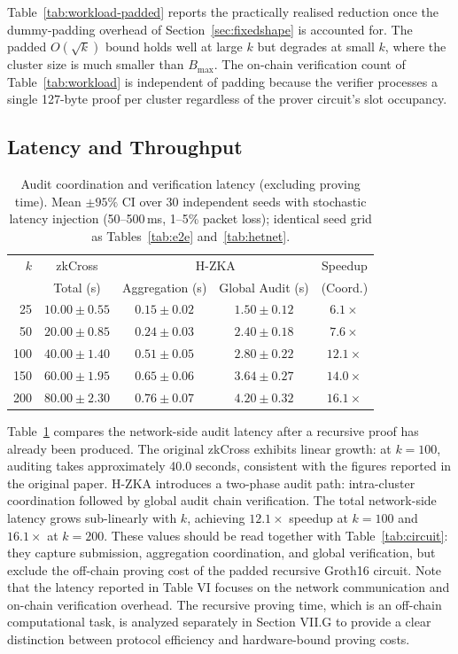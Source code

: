 \documentclass[journal]{IEEEtran}
\begin{document}
Table~\ref{tab:workload-padded} reports the practically realised reduction once the dummy-padding overhead of Section~\ref{sec:fixedshape} is accounted for. The padded $O(\sqrt{k})$ bound holds well at large $k$ but degrades at small $k$, where the cluster size is much smaller than $B_{\max}$. The on-chain verification count of Table~\ref{tab:workload} is independent of padding because the verifier processes a single 127-byte proof per cluster regardless of the prover circuit's slot occupancy.

\subsection{Latency and Throughput}

\begin{table}[t]
\centering
\caption{Audit coordination and verification latency (excluding proving time). Mean $\pm 95\%$ CI over $30$ independent seeds with stochastic latency injection (50--500\,ms, 1--5\% packet loss); identical seed grid as Tables~\ref{tab:e2e} and~\ref{tab:hetnet}.}
\label{tab:latency}
\begin{tabular}{rcccc}
\toprule
$k$ & zkCross & \multicolumn{2}{c}{H-ZKA} & Speedup \\
    & Total (s)   & Aggregation (s) & Global Audit (s) & (Coord.) \\
\midrule
25  & $10.00 \pm 0.55$ & $0.15 \pm 0.02$ & $1.50 \pm 0.12$ & $6.1\times$ \\
50  & $20.00 \pm 0.85$ & $0.24 \pm 0.03$ & $2.40 \pm 0.18$ & $7.6\times$ \\
100 & $40.00 \pm 1.40$ & $0.51 \pm 0.05$ & $2.80 \pm 0.22$ & $12.1\times$ \\
150 & $60.00 \pm 1.95$ & $0.65 \pm 0.06$ & $3.64 \pm 0.27$ & $14.0\times$ \\
200 & $80.00 \pm 2.30$ & $0.76 \pm 0.07$ & $4.20 \pm 0.32$ & $16.1\times$ \\
\bottomrule
\end{tabular}
\end{table}

Table~\ref{tab:latency} compares the network-side audit latency after a recursive proof has already been produced. The original zkCross exhibits linear growth: at $k = 100$, auditing takes approximately 40.0 seconds, consistent with the figures reported in the original paper. H-ZKA introduces a two-phase audit path: intra-cluster coordination followed by global audit chain verification. The total network-side latency grows sub-linearly with $k$, achieving $12.1\times$ speedup at $k = 100$ and $16.1\times$ at $k = 200$. These values should be read together with Table~\ref{tab:circuit}: they capture submission, aggregation coordination, and global verification, but exclude the off-chain proving cost of the padded recursive Groth16 circuit.
Note that the latency reported in Table VI focuses on the network communication and on-chain verification overhead. The recursive proving time, which is an off-chain computational task, is analyzed separately in Section VII.G to provide a clear distinction between protocol efficiency and hardware-bound proving costs.
\end{document}
